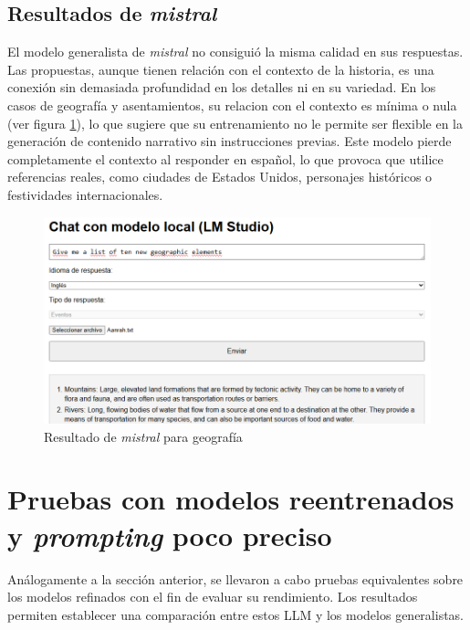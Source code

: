 \subsection{Resultados de \textit{mistral}}
El modelo generalista de \textit{mistral} no consiguió la misma calidad en sus respuestas.
Las propuestas, aunque tienen relación con el contexto de la historia,
es una conexión sin demasiada profundidad en los detalles ni en su variedad.
En los casos de geografía y asentamientos, su relacion con el contexto es mínima o nula
(ver figura \ref{fig:mistral-geo}), lo que sugiere que su entrenamiento no le permite ser
flexible en la generación de contenido narrativo sin instrucciones previas.
Este modelo pierde completamente el contexto al responder en español,
lo que provoca que utilice referencias reales,
como ciudades de Estados Unidos, personajes históricos o festividades internacionales.

\begin{figure}[htbp]
	\centering
	\includegraphics[width=1\textwidth]{./Figures/mistral-noprompt-geography.png}
	\caption{Resultado de \textit{mistral} para geografía}
	\label{fig:mistral-geo}
\end{figure}

\section{Pruebas con modelos reentrenados y \textit{prompting} poco preciso}
Análogamente a la sección anterior, se llevaron a cabo pruebas equivalentes
sobre los modelos refinados con el fin de evaluar su rendimiento.
Los resultados permiten establecer una comparación entre estos LLM
y los modelos generalistas.

